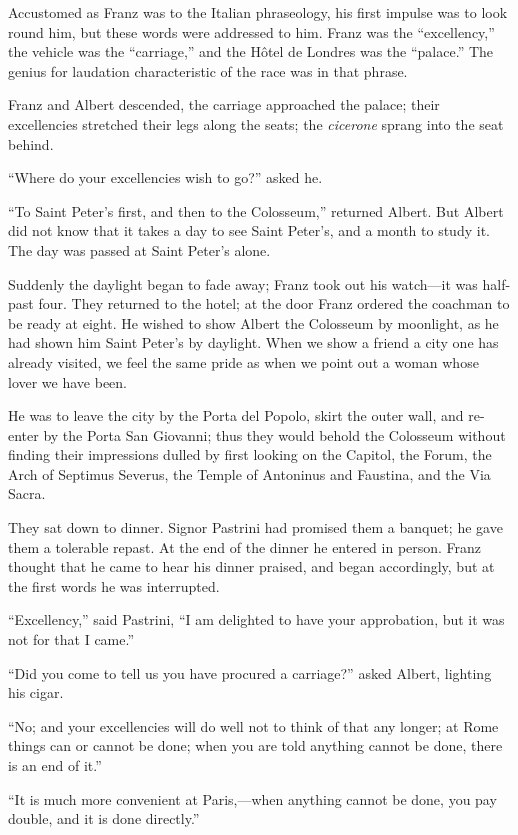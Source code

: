 Accustomed as Franz was to the Italian phraseology, his first impulse
was to look round him, but these words were addressed to him. Franz was
the “excellency,” the vehicle was the “carriage,” and the Hôtel de
Londres was the “palace.” The genius for laudation characteristic of
the race was in that phrase.

Franz and Albert descended, the carriage approached the palace; their
excellencies stretched their legs along the seats; the \textit{cicerone}
sprang into the seat behind.

“Where do your excellencies wish to go?” asked he.

“To Saint Peter’s first, and then to the Colosseum,” returned Albert.
But Albert did not know that it takes a day to see Saint Peter’s, and a
month to study it. The day was passed at Saint Peter’s alone.

Suddenly the daylight began to fade away; Franz took out his watch—it
was half-past four. They returned to the hotel; at the door Franz
ordered the coachman to be ready at eight. He wished to show Albert the
Colosseum by moonlight, as he had shown him Saint Peter’s by daylight.
When we show a friend a city one has already visited, we feel the same
pride as when we point out a woman whose lover we have been.

He was to leave the city by the Porta del Popolo, skirt the outer wall,
and re-enter by the Porta San Giovanni; thus they would behold the
Colosseum without finding their impressions dulled by first looking on
the Capitol, the Forum, the Arch of Septimus Severus, the Temple of
Antoninus and Faustina, and the Via Sacra.

They sat down to dinner. Signor Pastrini had promised them a banquet;
he gave them a tolerable repast. At the end of the dinner he entered in
person. Franz thought that he came to hear his dinner praised, and
began accordingly, but at the first words he was interrupted.

“Excellency,” said Pastrini, “I am delighted to have your approbation,
but it was not for that I came.”

“Did you come to tell us you have procured a carriage?” asked Albert,
lighting his cigar.

“No; and your excellencies will do well not to think of that any
longer; at Rome things can or cannot be done; when you are told
anything cannot be done, there is an end of it.”

“It is much more convenient at Paris,—when anything cannot be done, you
pay double, and it is done directly.”

